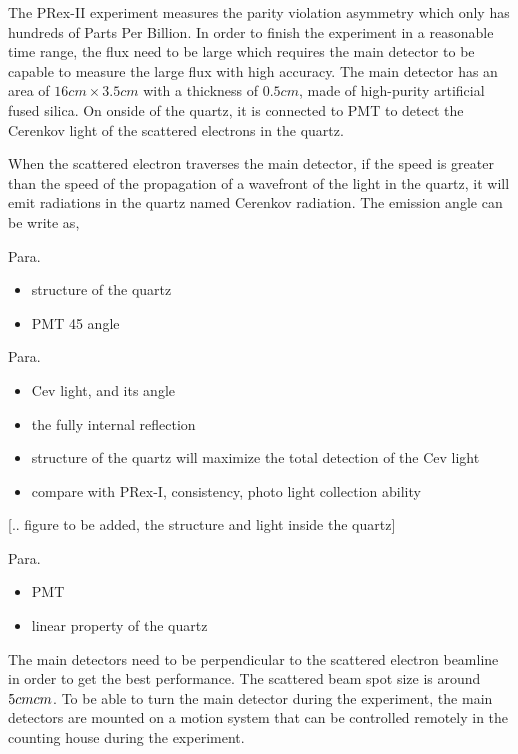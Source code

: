 The PRex-II experiment measures the parity violation asymmetry which only has hundreds of Parts Per Billion. In order to finish the experiment in a reasonable time range, the flux need to be large which requires the main detector to be capable to measure the large flux with high accuracy. The main detector has an area of $16cm \times 3.5cm$ with a thickness of $0.5cm$, made of high-purity artificial fused silica. On onside of the quartz, it is connected to PMT to detect the Cerenkov light of the scattered electrons in the quartz. 


When the scattered electron traverses the main detector, if the speed is greater than the speed of the propagation of a wavefront of the light in the quartz, it will emit radiations in the quartz named Cerenkov radiation. The emission angle can be write as,








Para. 

\begin{itemize}
    \item structure of the quartz 
    \item  PMT 45 angle
\end{itemize}


Para. 

\begin{itemize}
    \item Cev light, and its angle 
    \item the fully internal reflection 
    \item structure of the quartz will maximize the total detection of the Cev light
    \item compare with PRex-I, consistency, photo light collection ability
\end{itemize}


[.. figure to be added, the structure and light inside the quartz]


Para. 
\begin{itemize}
    \item PMT
    \item linear property of the quartz
\end{itemize}


The main detectors need to be perpendicular to the scattered electron beamline in order to get the best performance. The scattered beam spot size is around $5cm \time
 5cm $. To be able to turn the main detector during the experiment, the main detectors are mounted on a motion system that can be controlled remotely in the counting house during the experiment.  


